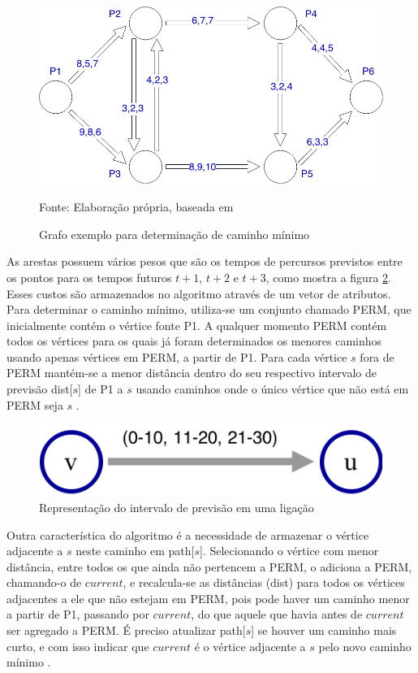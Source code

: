 \begin{figure}[htbp]
\centering
 \includegraphics[width=.60\textwidth]{figuras/leo1.png}
\caption{Grafo exemplo para determinação de caminho mínimo}
Fonte: Elaboração própria, baseada em \cite{leonard}
\label{fig:leo1}
\end{figure}

As arestas possuem vários pesos que são os tempos de percursos previstos entre os pontos para os tempos
futuros $t + 1$, $t + 2$ e $t + 3$, como mostra a figura \ref{fig:intervalotemporal}. Esses custos são armazenados
no algoritmo através de um vetor de atributos.
Para determinar o caminho mínimo, utiliza-se um conjunto chamado PERM, que inicialmente contém o vértice fonte P1.
A qualquer momento PERM contém todos os vértices para os quais já foram determinados os menores caminhos usando
apenas vértices em PERM, a partir de P1. Para cada vértice $s$ fora de PERM mantém-se a menor distância dentro do
seu respectivo intervalo de previsão dist[$s$] de P1 a $s$ usando caminhos onde o único vértice que não está em
PERM seja $s$ \cite{leonard}.

\begin{figure}[htbp]
\centering
 \includegraphics[width=.60\textwidth]{figuras/intervalotemporal.png}
\caption{Representação do intervalo de previsão em uma ligação}
\label{fig:intervalotemporal}
\end{figure}

Outra característica do algoritmo é a necessidade de armazenar o vértice adjacente
a $s$ neste caminho em path[$s$]. Selecionando o vértice com menor distância, entre todos os que ainda não pertencem
a PERM, o adiciona a PERM, chamando-o de $current$, e recalcula-se as distâncias (dist) para todos os vértices
adjacentes a ele que não estejam em PERM, pois pode haver um caminho menor a partir de P1, passando por $current$, 
do que aquele que havia antes de $current$ ser agregado a PERM. É preciso atualizar path[$s$] se houver um caminho
mais curto, e com isso indicar que $current$ é o vértice adjacente a $s$ pelo novo caminho mínimo \cite{leonard}.

